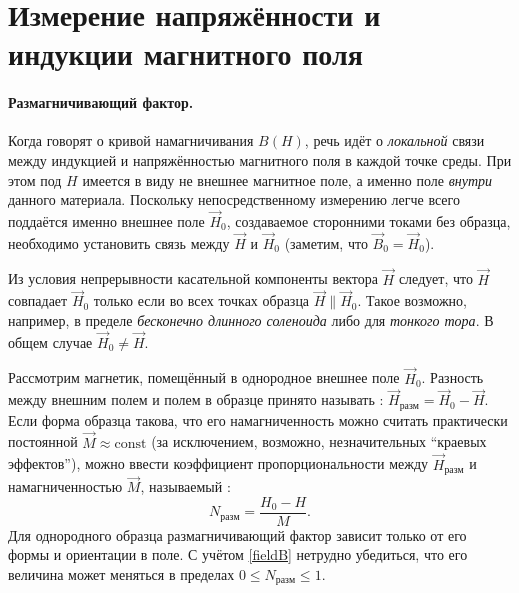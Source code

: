 %


\section{Измерение напряжённости и индукции магнитного поля}
\label{sec:measure-HB}

\paragraph{Размагничивающий фактор.}
Когда говорят о кривой намагничивания $B(H)$,
речь идёт о \emph{локальной} связи между
индукцией и напряжённостью магнитного поля в каждой точке среды.
При этом под $H$ имеется в виду не внешнее магнитное поле,
а именно поле \emph{внутри} данного материала. Поскольку непосредственному
измерению легче всего поддаётся именно внешнее поле $\vec{H}_{0}$,
создаваемое сторонними токами без образца, необходимо установить связь
между $\vec{H}$ и $\vec{H}_0$ (заметим, что $\vec{B}_0=\vec{H}_0$).

Из условия непрерывности касательной компоненты вектора $\vec{H}$ следует,
что $\vec{H}$ совпадает $\vec{H}_{0}$ только если во всех точках образца
$\vec{H} \parallel \vec{H}_{0}$.
Такое возможно, например, в пределе \emph{бесконечно длинного соленоида} либо
для \emph{тонкого тора}.
В общем случае $\vec{H}_0 \ne \vec{H}$.

Рассмотрим магнетик, помещённый в однородное внешнее поле $\vec{H}_0$.
Разность между внешним полем и полем в образце принято называть
:
$\vec{H}_{разм} = \vec{H}_0 - \vec{H}$.
Если форма образца такова, что его намагниченность можно считать
практически постоянной $\vec{M}\approx\mathrm{const}$ (за исключением,
возможно, незначительных ``краевых эффектов''), можно ввести
коэффициент пропорциональности между $\vec{H}_{разм}$ и намагниченностью $\vec{M}$,
называемый :
\[
N_{разм} = \frac{H_0-H}{M}.
\]
Для однородного образца размагничивающий фактор зависит
только от его формы и ориентации в поле.
С учётом \eqref{fieldB} нетрудно убедиться, что его величина может меняться в пределах $0\le N_{разм} \le 1$.


